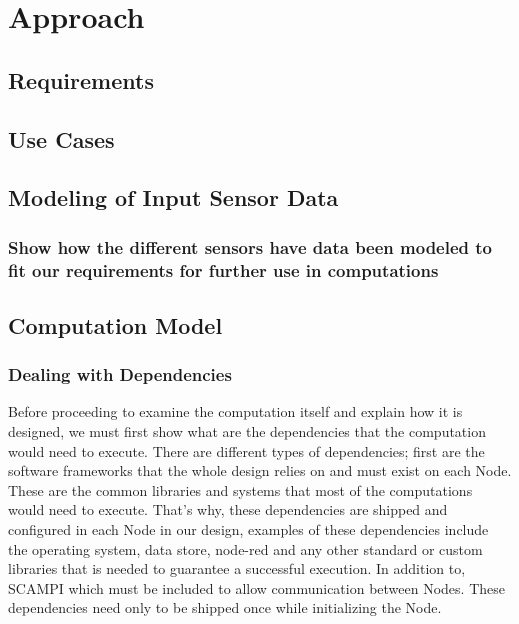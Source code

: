 
\chapter{Approach}\label{chapter:Approach}

\section{Requirements}
\section{Use Cases}
\section{Modeling of Input Sensor Data}
\subsection{Show how the different sensors have data been modeled to fit our requirements for further use in computations}



\section{Computation Model}
\newpage
\subsection{Dealing with Dependencies}
Before proceeding to examine the computation itself and explain how it is designed, we must first show what are the dependencies that the computation would need to execute. There are different types of dependencies; first are the software frameworks that the whole design relies on and must exist on each Node. These are the common libraries and systems that most of the computations would need to execute. That's why, these dependencies are shipped and configured in each Node in our design, examples of these dependencies include the operating system, data store, node-red and any other standard or custom libraries that is needed to guarantee a successful execution. In addition to, SCAMPI which must be included to allow communication between Nodes. These dependencies need only to be shipped once while initializing the Node.

